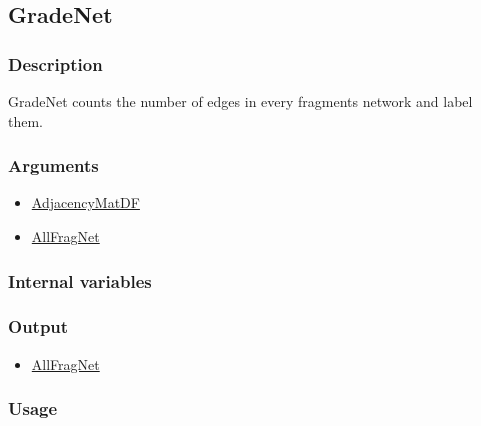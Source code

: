 \subsection{GradeNet}\label{GradeNet}
\subsubsection{Description}
GradeNet counts the number of edges in every fragments network and label them.
\subsubsection{Arguments}
\begin{itemize}
\item \hyperref[AdjacencyMatDF]{AdjacencyMatDF}
\item \hyperref[AllFragNet]{AllFragNet}
\end{itemize}
\subsubsection{Internal variables}
\subsubsection{Output}
\begin{itemize}
\item \hyperref[AllFragNet]{AllFragNet}
\end{itemize}
\subsubsection{Usage}

